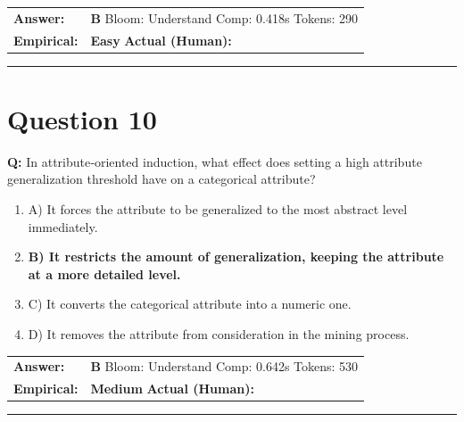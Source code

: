 \documentclass[9pt]{article}
\begin{document}
\begin{tabular}{@{}l p{10.5cm}@{}}
\textbf{Answer:} & \textbf{B} \hspace{1em} Bloom: Understand \hspace{1em} Comp: 0.418s \hspace{1em} Tokens: 290 \\
\textbf{Empirical:} & \textbf{Easy} \hspace{1em} \textbf{Actual (Human):} \underline{\hspace{5cm}}
\end{tabular}

\vspace{0.2cm}
\rule{\textwidth}{0.4pt}
\vspace{0.2cm}


\section*{Question 10}

\textbf{Q:} In attribute‑oriented induction, what effect does setting a high attribute generalization threshold have on a categorical attribute?

\begin{enumerate}[label=\textbf{\alph{*})}, nosep]
    \item A) It forces the attribute to be generalized to the most abstract level immediately.
    \item \textbf{B) It restricts the amount of generalization, keeping the attribute at a more detailed level.} %
    \item C) It converts the categorical attribute into a numeric one.
    \item D) It removes the attribute from consideration in the mining process.

\end{enumerate}

\begin{tabular}{@{}l p{10.5cm}@{}}
\textbf{Answer:} & \textbf{B} \hspace{1em} Bloom: Understand \hspace{1em} Comp: 0.642s \hspace{1em} Tokens: 530 \\
\textbf{Empirical:} & \textbf{Medium} \hspace{1em} \textbf{Actual (Human):} \underline{\hspace{5cm}}
\end{tabular}

\vspace{0.2cm}
\rule{\textwidth}{0.4pt}
\vspace{0.2cm}
\end{document}
